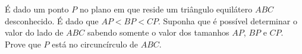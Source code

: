 É dado um ponto $P$ no plano em que reside um triângulo equilátero $ABC$ desconhecido. É dado que $AP < BP < CP$. Suponha que é possível determinar o valor do lado de $ABC$ sabendo somente o valor dos tamanhos $AP$, $BP$ e $CP$. Prove que $P$ está no circuncírculo de $ABC$.

